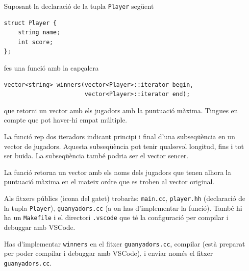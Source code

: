

\Statement

Suposant la declaració de la tupla \verb|Player| següent
\begin{verbatim}
struct Player { 
    string name; 
    int score;
};
\end{verbatim}
fes una funció amb la capçalera
\begin{verbatim}
vector<string> winners(vector<Player>::iterator begin,
                       vector<Player>::iterator end);
\end{verbatim}
que retorni un vector amb els jugadors amb la puntuació
màxima. Tingues en compte que pot haver-hi empat múltiple.

\Input

La funció rep dos iteradors indicant principi i final d'una subseqüència en un vector de jugadors. Aquesta subseqüència pot tenir qualsevol longitud, fins i tot ser buida. La subseqüència també podria ser el vector sencer.

\Output

La funció retorna un vector amb els noms dels jugadors que tenen
alhora la puntuació màxima en el mateix ordre que es troben al vector
original.

\Observation

Als fitxers públics (icona del gatet) trobaràs: \verb|main.cc|, \verb|player.hh| (declaració de la tupla \verb|Player|), \verb|guanyadors.cc| (a on has d'implementar la funció). També hi ha un \verb|Makefile| i el directori \verb|.vscode| que té la configuració per compilar i debuggar amb VSCode.

Has d'implementar \verb|winners| en el fitxer \verb|guanyadors.cc|, compilar (està preparat per poder compilar i debuggar amb VSCode), i enviar només el fitxer \verb|guanyadors.cc|.

\SampleTwoCol
